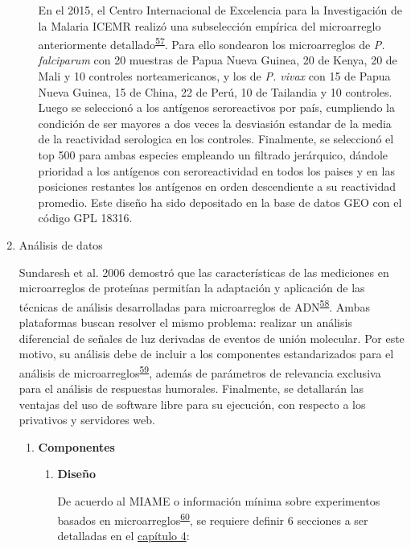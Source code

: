 \documentclass[]{article}
\begin{document}
\begin{enumerate}
\begin{enumerate}
    En el 2015, el Centro Internacional de Excelencia para la
    Investigación de la Malaria ICEMR realizó una subselección empírica
    del microarreglo anteriormente
    detallado\textsuperscript{\protect\hyperlink{ref-King2015FOC}{57}}.
    Para ello sondearon los microarreglos de \emph{P. falciparum} con 20
    muestras de Papua Nueva Guinea, 20 de Kenya, 20 de Mali y 10
    controles norteamericanos, y los de \emph{P. vivax} con 15 de Papua
    Nueva Guinea, 15 de China, 22 de Perú, 10 de Tailandia y 10
    controles. Luego se seleccionó a los antígenos seroreactivos por
    país, cumpliendo la condición de ser mayores a dos veces la
    desviasión estandar de la media de la reactividad serologica en los
    controles. Finalmente, se seleccionó el top 500 para ambas especies
    empleando un filtrado jerárquico, dándole prioridad a los antígenos
    con seroreactividad en todos los paises y en las posiciones
    restantes los antígenos en orden descendiente a su reactividad
    promedio. Este diseño ha sido depositado en la base de datos GEO con
    el código GPL 18316.
  \end{enumerate}
\item
  Análisis de datos

  Sundaresh et al. 2006 demostró que las características de las
  mediciones en microarreglos de proteínas permitían la adaptación y
  aplicación de las técnicas de análisis desarrolladas para
  microarreglos de
  ADN\textsuperscript{\protect\hyperlink{ref-sundaresh2006}{58}}. Ambas
  plataformas buscan resolver el mismo problema: realizar un análisis
  diferencial de señales de luz derivadas de eventos de unión molecular.
  Por este motivo, su análisis debe de incluir a los componentes
  estandarizados para el análisis de
  microarreglos\textsuperscript{\protect\hyperlink{ref-allison2006}{59}},
  además de parámetros de relevancia exclusiva para el análisis de
  respuestas humorales. Finalmente, se detallarán las ventajas del uso
  de software libre para su ejecución, con respecto a los privativos y
  servidores web.

  \begin{enumerate}
  \def\labelenumii{\roman{enumii}.}
  \item
    \textbf{Componentes}

    \begin{enumerate}
    \def\labelenumiii{\arabic{enumiii}.}
    \item
      \textbf{Diseño}

      De acuerdo al MIAME o información mínima sobre experimentos
      basados en
      microarreglos\textsuperscript{\protect\hyperlink{ref-brazma2001}{60}},
      se requiere definir 6 secciones a ser detalladas en el
      \protect\hyperlink{meto}{capítulo 4}:


\end{enumerate}
\end{enumerate}
\end{enumerate}
\end{document}
